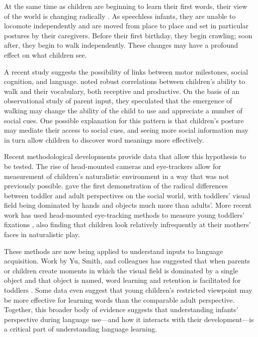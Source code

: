 \documentclass[10pt,letterpaper]{article}
\begin{document}
At the same time as children are beginning to learn their first words, their view of the world is changing radically \cite{adolph2007}. As speechless infants, they are unable to locomote independently and are moved from place to place and set in particular postures by their caregivers. Before their first birthday, they begin crawling; soon after, they begin to walk independently. These changes may have a profound effect on what children see.

A recent study suggests the possibility of links between motor milestones, social cognition, and language.  noted robust correlations between children's ability to walk and their vocabulary, both receptive and productive. On the basis of an observational study of parent input, they speculated that the emergence of walking may change the ability of the child to use and appreciate a number of social cues. One possible explanation for this pattern is that children's posture may mediate their access to social cues, and seeing more social information may in turn allow children to discover word meanings more effectively.

Recent methodological developments provide data that allow this hypothesis to be tested. The rise of head-mounted cameras and eye-trackers allow for measurement of children's naturalistic environment in a way that was not previously possible.  gave the first demonstration of the radical differences between toddler and adult perspectives on the social world, with toddlers' visual field being dominated by hands and objects much more than adults'. More recent work has used head-mounted eye-tracking methods to measure young toddlers' fixations \cite{franchak2011}, also finding that children look relatively infrequently at their mothers' faces in naturalistic play.

These methods are now being applied to understand inputs to language acquisition. Work by Yu, Smith, and colleagues has suggested that when parents or children create moments in which the visual field is dominated by a single object and that object is named, word learning and retention is facilitated for toddlers \cite{smith2011,yuinpress}. Some data even suggest that young children's restricted viewpoint may be more effective for learning words than the comparable adult perspective\cite{yurovskyinpress}. Together, this broader body of evidence suggests that understanding infants' perspective during language use---and how it interacts with their development---is a critical part of understanding language learning.
\end{document}
